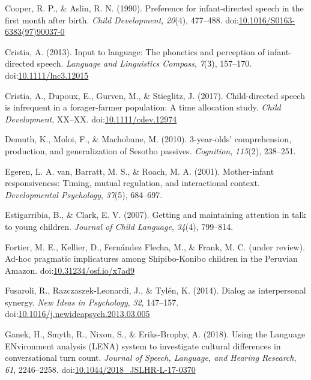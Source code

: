 \documentclass[floatsintext,man]{apa6}
\theoremstyle{definition}
\theoremstyle{definition}
\theoremstyle{definition}
\theoremstyle{remark}
\begin{document}
\hypertarget{ref-cooper1990preference}{}
Cooper, R. P., \& Aslin, R. N. (1990). Preference for infant-directed
speech in the first month after birth. \emph{Child Development},
\emph{20}(4), 477--488.
doi:\href{https://doi.org/10.1016/S0163-6383(97)90037-0}{10.1016/S0163-6383(97)90037-0}

\hypertarget{ref-cristia2013input}{}
Cristia, A. (2013). Input to language: The phonetics and perception of
infant-directed speech. \emph{Language and Linguistics Compass},
\emph{7}(3), 157--170.
doi:\href{https://doi.org/10.1111/lnc3.12015}{10.1111/lnc3.12015}

\hypertarget{ref-cristia2017child}{}
Cristia, A., Dupoux, E., Gurven, M., \& Stieglitz, J. (2017).
Child-directed speech is infrequent in a forager-farmer population: A
time allocation study. \emph{Child Development}, XX--XX.
doi:\href{https://doi.org/10.1111/cdev.12974}{10.1111/cdev.12974}

\hypertarget{ref-demuth2010three}{}
Demuth, K., Moloi, F., \& Machobane, M. (2010). 3-year-olds'
comprehension, production, and generalization of Sesotho passives.
\emph{Cognition}, \emph{115}(2), 238--251.

\hypertarget{ref-vanegeren2001mother}{}
Egeren, L. A. van, Barratt, M. S., \& Roach, M. A. (2001). Mother-infant
responsiveness: Timing, mutual regulation, and interactional context.
\emph{Developmental Psychology}, \emph{37}(5), 684--697.

\hypertarget{ref-estigarribia2007getting}{}
Estigarribia, B., \& Clark, E. V. (2007). Getting and maintaining
attention in talk to young children. \emph{Journal of Child Language},
\emph{34}(4), 799--814.

\hypertarget{ref-fortierURadhoc}{}
Fortier, M. E., Kellier, D., Fernández Flecha, M., \& Frank, M. C.
(under review). Ad-hoc pragmatic implicatures among Shipibo-Konibo
children in the Peruvian Amazon.
doi:\href{https://doi.org/10.31234/osf.io/x7ad9}{10.31234/osf.io/x7ad9}

\hypertarget{ref-fusaroli2014synergy}{}
Fusaroli, R., Razczaszek-Leonardi, J., \& Tylén, K. (2014). Dialog as
interpersonal synergy. \emph{New Ideas in Psychology}, \emph{32},
147--157.
doi:\href{https://doi.org/10.1016/j.newideapsych.2013.03.005}{10.1016/j.newideapsych.2013.03.005}

\hypertarget{ref-ganek2018using}{}
Ganek, H., Smyth, R., Nixon, S., \& Eriks-Brophy, A. (2018). Using the
Language ENvironment analysis (LENA) system to investigate cultural
differences in conversational turn count. \emph{Journal of Speech,
Language, and Hearing Research}, \emph{61}, 2246--2258.
doi:\href{https://doi.org/10.1044/2018_JSLHR-L-17-0370}{10.1044/2018\_JSLHR-L-17-0370}
\end{document}
